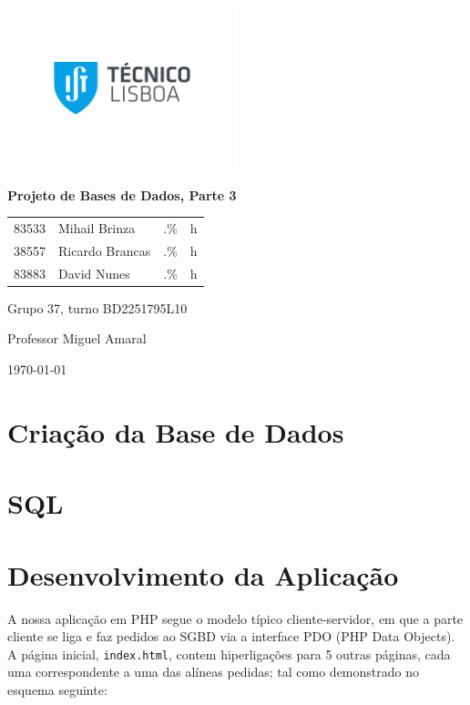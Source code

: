 \documentclass[a4paper]{article}
\begin{document}
    \begin{titlepage}
        \centering
        \includegraphics[width=0.5\textwidth]{IST_A_CMYK_POS.pdf}\par
        {\huge\bfseries Projeto de Bases de Dados, Parte 3\par}
        \vspace{2cm}
        {
        \Large
        \begin{tabular}{llll}
            83533 & Mihail Brinza & .\% & h \\
            38557 & Ricardo Brancas & .\% & h \\
            83883 & David Nunes & .\% & h
        \end{tabular}
        }
        \vfill
        \large
        Grupo 37, turno BD2251795L10 \par
        Professor Miguel Amaral

        \vspace{3cm}

        {\normalsize \today\par}
    \end{titlepage}

    \section{Criação da Base de Dados}
    

    \section{SQL}
    

    \section{Desenvolvimento da Aplicação}
    A nossa aplicação em PHP segue o modelo típico cliente-servidor, em que a parte cliente se liga e faz pedidos ao SGBD
    via a interface PDO (PHP Data Objects).
    A página inicial, \texttt{index.html}, contem hiperligações para 5 outras páginas, cada uma correspondente
    a uma das alíneas pedidas; tal como demonstrado no esquema seguinte:
\end{document}
